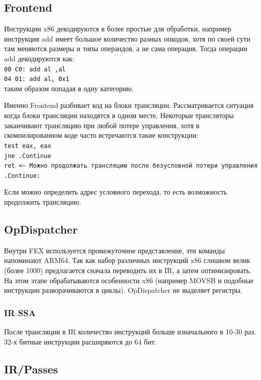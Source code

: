\subsection{Frontend}
Инструкции x86 декодируются в более простые для обработки, например инструкция add имеет большое количество разных опкодов, хотя по своей сути там меняются размеры и типы операндов, а не сама операция. Тогда операции add декодируются как:
\texttt{
\\
00 C0: add al ,al  \\
04 01: add al, 0x1 \\}
таким образом попадая в одну категорию.

Именно Frontend разбивает код на блоки трансляции. Рассматривается ситуация когда блоки трансляции находятся в одном месте. Некоторые трансляторы заканчивают трансляцию при любой потере управления, хотя в скомпилированном коде часто встречаются такие конструкции:
\texttt{
\\
test eax, eax\\
jne .Continue\\
ret           <--- Можно продолжать трансляцию после безусловной потери управления\\
.Continue:\\
}

Если можно определить адрес условного перехода, то есть возможность продолжить трансляцию.

\subsection{OpDispatcher}

Внутри FEX используется промежуточное представление, эти команды напоминают ARM64. Так как набор различных инструкций x86 слишком велик (более 1000) предлагается сначала переводить их в IR, а затем оптимизировать. На этом этапе обрабатываются особенности x86 (например MOVSB и подобные инструкции разворачиваются в циклы). OpDispatcher не выделяет регистры. 

\subsubsection{IR SSA}

После трансляции в IR количество инструкций больше изначального в 10-30 раз. 32-х битные инструкции расширяются до 64 бит.

\subsection{IR/Passes}

